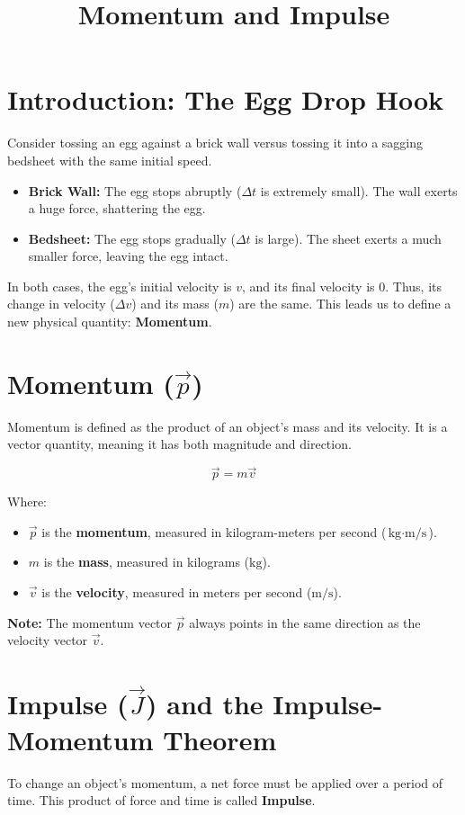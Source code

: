 \documentclass{article}
\begin{document}
\title{Momentum and Impulse}
\author{}
\date{}
\maketitle

\section{Introduction: The Egg Drop Hook}
Consider tossing an egg against a brick wall versus tossing it into a sagging bedsheet with the same initial speed.
\begin{itemize}
    \item \textbf{Brick Wall:} The egg stops abruptly ($\Delta t$ is extremely small). The wall exerts a huge force, shattering the egg.
    \item \textbf{Bedsheet:} The egg stops gradually ($\Delta t$ is large). The sheet exerts a much smaller force, leaving the egg intact.
\end{itemize}
In both cases, the egg's initial velocity is $v$, and its final velocity is $0$. Thus, its change in velocity ($\Delta v$) and its mass ($m$) are the same. This leads us to define a new physical quantity: \textbf{Momentum}.

\section{Momentum ($\vec{p}$)}
Momentum is defined as the product of an object's mass and its velocity. It is a vector quantity, meaning it has both magnitude and direction.

\begin{equation}
\vec{p} = m\vec{v}
\end{equation}

Where:
\begin{itemize}
    \item $\vec{p}$ is the \textbf{momentum}, measured in kilogram-meters per second ($\text{kg} \cdot \text{m/s}$).
    \item $m$ is the \textbf{mass}, measured in kilograms ($\text{kg}$).
    \item $\vec{v}$ is the \textbf{velocity}, measured in meters per second ($\text{m/s}$).
\end{itemize}
\textbf{Note:} The momentum vector $\vec{p}$ always points in the same direction as the velocity vector $\vec{v}$.

\section{Impulse ($\vec{J}$) and the Impulse-Momentum Theorem}
To change an object's momentum, a net force must be applied over a period of time. This product of force and time is called \textbf{Impulse}.
\end{document}
